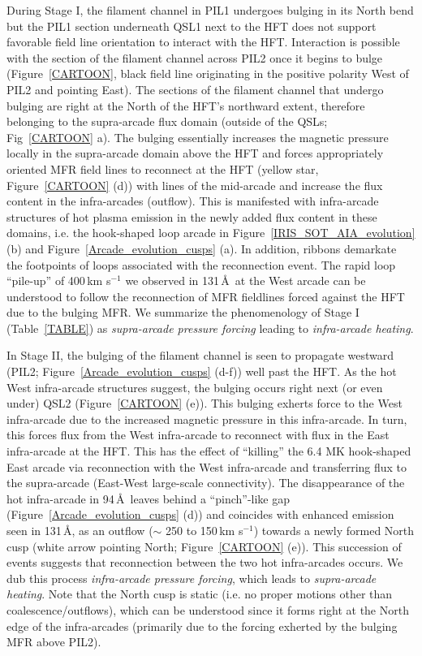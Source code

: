 \documentclass[preprint]{aastex}
\begin{document}
During Stage I, the filament channel in PIL1 undergoes bulging in its North bend but the PIL1 section underneath QSL1 next to the HFT does not support favorable field line orientation to interact with the HFT. Interaction is possible with the section of the filament channel across PIL2 once it begins to bulge (Figure~\ref{CARTOON}, black field line originating in the positive polarity West of PIL2 and pointing East). The sections of the filament channel that undergo bulging are right at the North of the HFT's northward extent, therefore belonging to the supra-arcade flux domain (outside of the QSLs; Fig~\ref{CARTOON} a). The bulging essentially increases the magnetic pressure locally in the supra-arcade domain above the HFT and forces appropriately oriented MFR field lines to reconnect at the HFT (yellow star, Figure~\ref{CARTOON} (d)) with lines of the mid-arcade and increase the flux content in the infra-arcades (outflow). This is manifested with infra-arcade structures of hot plasma emission in the newly added flux content in these domains, i.e. the hook-shaped loop arcade in Figure~\ref{IRIS_SOT_AIA_evolution} (b) and Figure~\ref{Arcade_evolution_cusps} (a). In addition, ribbons demarkate the footpoints of loops associated with the reconnection event. The rapid loop ``pile-up'' of 400\,km s$^{-1}$ we observed in 131\,\AA\ at the West arcade can be understood to follow the reconnection of MFR fieldlines forced against the HFT due to the bulging MFR. We summarize the phenomenology of Stage I (Table~\ref{TABLE}) as \emph{supra-arcade pressure forcing} leading to \emph{infra-arcade heating}.

In Stage II, the bulging of the filament channel is seen to propagate westward (PIL2; Figure~\ref{Arcade_evolution_cusps} (d-f)) well past the HFT. As the hot West infra-arcade structures suggest, the bulging occurs right next (or even under) QSL2 (Figure~\ref{CARTOON} (e)). This bulging exherts force to the West infra-arcade due to the increased magnetic pressure in this infra-arcade. In turn, this forces flux from the West infra-arcade to reconnect with flux in the East infra-arcade at the HFT. This has the effect of ``killing'' the 6.4 MK hook-shaped East arcade via reconnection with the West infra-arcade and transferring flux to the supra-arcade (East-West large-scale connectivity). The disappearance of the hot infra-arcade in 94\,\AA\ leaves behind a ``pinch''-like gap (Figure~\ref{Arcade_evolution_cusps} (d)) and coincides with enhanced emission seen in 131\,\AA, as an outflow ($\sim$ 250 to 150\,km s$^{-1}$) towards a newly formed North cusp (white arrow pointing North; Figure~\ref{CARTOON} (e)). This succession of events suggests that reconnection between the two hot infra-arcades occurs. We dub this process \emph{infra-arcade pressure forcing}, which leads to \emph{supra-arcade heating}. Note that the North cusp is static (i.e. no proper motions other than coalescence/outflows), which can be understood since it forms right at the North edge of the infra-arcades (primarily due to the forcing exherted by the bulging MFR above PIL2).
\end{document}
